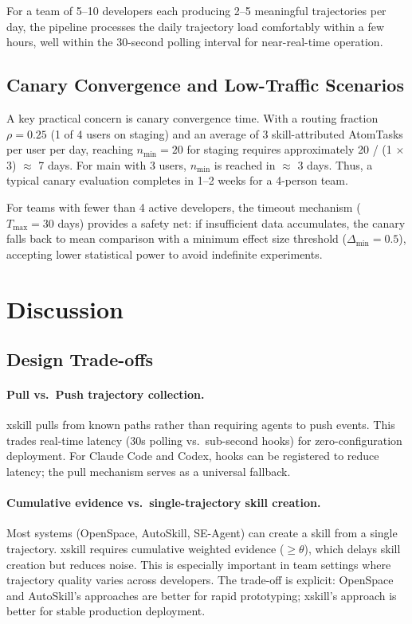\documentclass[11pt]{article}
\begin{document}
For a team of 5--10 developers each producing 2--5 meaningful trajectories per day, the pipeline processes the daily trajectory load comfortably within a few hours, well within the 30-second polling interval for near-real-time operation.

\subsection{Canary Convergence and Low-Traffic Scenarios}

A key practical concern is canary convergence time. With a routing fraction $\rho = 0.25$ (1 of 4 users on staging) and an average of 3 skill-attributed AtomTasks per user per day, reaching $n_{\min} = 20$ for staging requires approximately 20 / (1 $\times$ 3) $\approx$ 7 days. For main with 3 users, $n_{\min}$ is reached in $\approx$ 3 days. Thus, a typical canary evaluation completes in 1--2 weeks for a 4-person team.

For teams with fewer than 4 active developers, the timeout mechanism ($T_{\max} = 30$ days) provides a safety net: if insufficient data accumulates, the canary falls back to mean comparison with a minimum effect size threshold ($\Delta_{\min} = 0.5$), accepting lower statistical power to avoid indefinite experiments.


\section{Discussion}
\label{sec:discussion}

\subsection{Design Trade-offs}

\paragraph{Pull vs.\ Push trajectory collection.} xskill pulls from known paths rather than requiring agents to push events. This trades real-time latency (30s polling vs.\ sub-second hooks) for zero-configuration deployment. For Claude Code and Codex, hooks can be registered to reduce latency; the pull mechanism serves as a universal fallback.

\paragraph{Cumulative evidence vs.\ single-trajectory skill creation.} Most systems (OpenSpace, AutoSkill, SE-Agent) can create a skill from a single trajectory. xskill requires cumulative weighted evidence ($\geq\theta$), which delays skill creation but reduces noise. This is especially important in team settings where trajectory quality varies across developers. The trade-off is explicit: OpenSpace and AutoSkill's approaches are better for rapid prototyping; xskill's approach is better for stable production deployment.
\end{document}

